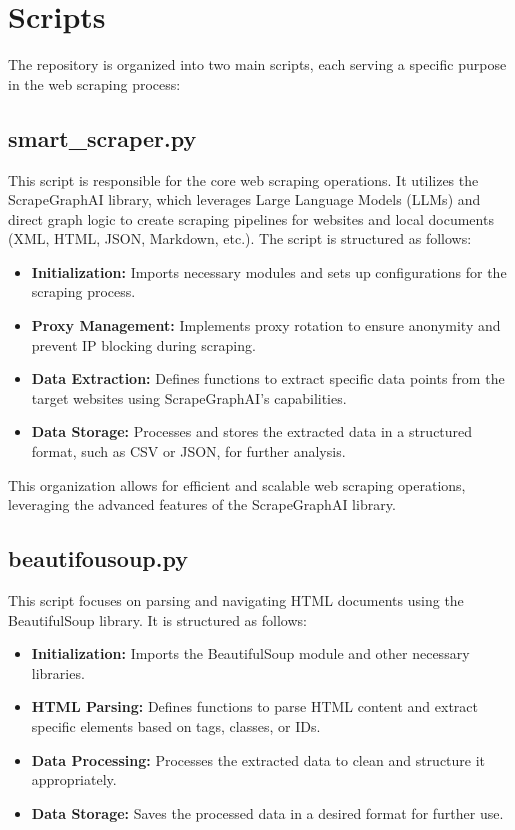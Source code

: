 \section{Scripts}

The repository is organized into two main scripts, each serving a specific purpose in the web scraping process:

\subsection{smart\_scraper.py}

This script is responsible for the core web scraping operations. It utilizes the ScrapeGraphAI library, which leverages Large Language Models (LLMs) and direct graph logic to create scraping pipelines for websites and local documents (XML, HTML, JSON, Markdown, etc.). The script is structured as follows:

\begin{itemize}
    \item \textbf{Initialization:} Imports necessary modules and sets up configurations for the scraping process.
    \item \textbf{Proxy Management:} Implements proxy rotation to ensure anonymity and prevent IP blocking during scraping.
    \item \textbf{Data Extraction:} Defines functions to extract specific data points from the target websites using ScrapeGraphAI's capabilities.
    \item \textbf{Data Storage:} Processes and stores the extracted data in a structured format, such as CSV or JSON, for further analysis.
\end{itemize}

This organization allows for efficient and scalable web scraping operations, leveraging the advanced features of the ScrapeGraphAI library.

\subsection{beautifousoup.py}

This script focuses on parsing and navigating HTML documents using the BeautifulSoup library. It is structured as follows:

\begin{itemize}
    \item \textbf{Initialization:} Imports the BeautifulSoup module and other necessary libraries.
    \item \textbf{HTML Parsing:} Defines functions to parse HTML content and extract specific elements based on tags, classes, or IDs.
    \item \textbf{Data Processing:} Processes the extracted data to clean and structure it appropriately.
    \item \textbf{Data Storage:} Saves the processed data in a desired format for further use.
\end{itemize}

